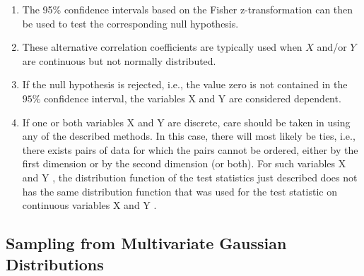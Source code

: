 \begin{enumerate}
\begin{enumerate}
        \item The 95\% confidence intervals based on the Fisher z-transformation can then be used to test the corresponding null hypothesis.
        \hfill \cite{statistics/book/Statistics-for-Data-Scientists/Maurits-Kaptein}

        \item These alternative correlation coefficients are typically used when $X$ and/or $Y$ are continuous but not normally distributed.
        \hfill \cite{statistics/book/Statistics-for-Data-Scientists/Maurits-Kaptein}

        \item If the null hypothesis is rejected, i.e., the value zero is not contained in the $95\%$ confidence interval, the variables X and Y are considered dependent.
        \hfill \cite{statistics/book/Statistics-for-Data-Scientists/Maurits-Kaptein}

        \item If one or both variables X and Y are discrete, care should be taken in using any of the described methods. 
        In this case, there will most likely be ties, i.e., there exists pairs of data for which the pairs cannot be ordered, either by the first dimension or by the second dimension (or both).
        For such variables X and Y , the distribution function of the test statistics just described does not has the same distribution function that was used for the test statistic on continuous variables X and Y .
        \hfill \cite{statistics/book/Statistics-for-Data-Scientists/Maurits-Kaptein}
    \end{enumerate}
\end{enumerate}







\subsection{Sampling from Multivariate Gaussian Distributions}

